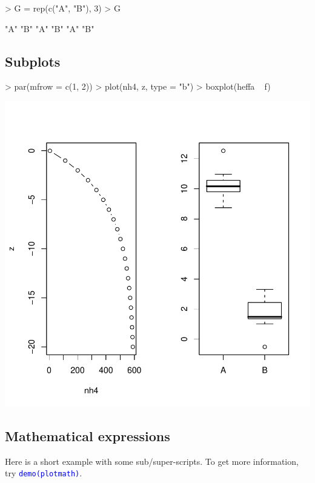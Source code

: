 \documentclass{scrartcl}
\newcommand{\Rcode}[1]{\texttt{\textcolor{blue}{#1}}}
\begin{document}
\begin{Schunk}
\begin{Sinput}
> G = rep(c("A", "B"), 3)
> G
\end{Sinput}
\begin{Soutput}
[1] "A" "B" "A" "B" "A" "B"
\end{Soutput}
\end{Schunk}
\subsection{Subplots}
\label{sec:subplots}

\begin{Schunk}
\begin{Sinput}
> par(mfrow = c(1, 2))
> plot(nh4, z, type = "b")
> boxplot(heffa ~ f)
\end{Sinput}
\end{Schunk}
\includegraphics{figures/f-subplot}

\subsection{Mathematical expressions}
Here is a short example with some sub/super-scripts. To get more
information, try \Rcode{demo(plotmath)}.
\end{document}
